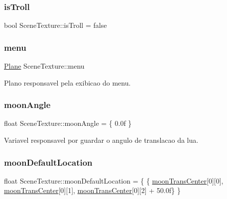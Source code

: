 \mbox{\label{class_scene_texture_a2b54560296f6bb1cd10a7f62a891641e}} 
\subsubsection{\texorpdfstring{isTroll}{isTroll}}
{\footnotesize\ttfamily bool Scene\+Texture\+::is\+Troll = false\hspace{0.3cm}{\ttfamily [static]}}

\mbox{\label{class_scene_texture_acd845ab828b015b22f1b92a111130076}} 
\subsubsection{\texorpdfstring{menu}{menu}}
{\footnotesize\ttfamily \mbox{\hyperlink{class_plane}{Plane}} Scene\+Texture\+::menu\hspace{0.3cm}{\ttfamily [private]}}



Plano responsavel pela exibicao do menu. 

\mbox{\label{class_scene_texture_a679a4ff577f9a7a82018aff021a94c13}} 
\subsubsection{\texorpdfstring{moonAngle}{moonAngle}}
{\footnotesize\ttfamily float Scene\+Texture\+::moon\+Angle = \{ 0.\+0f \}\hspace{0.3cm}{\ttfamily [static]}}



Variavel responsavel por guardar o angulo de translacao da lua. 

\mbox{\label{class_scene_texture_ae53e83f7c540d834710356dc43b991f3}} 
\subsubsection{\texorpdfstring{moonDefaultLocation}{moonDefaultLocation}}
{\footnotesize\ttfamily float Scene\+Texture\+::moon\+Default\+Location = \{ \{ \mbox{\hyperlink{class_scene_texture_a116f1f15f385d94dee75092b2feaa20c}{moon\+Trans\+Center}}\mbox{[}0\mbox{]}\mbox{[}0\mbox{]}, \mbox{\hyperlink{class_scene_texture_a116f1f15f385d94dee75092b2feaa20c}{moon\+Trans\+Center}}\mbox{[}0\mbox{]}\mbox{[}1\mbox{]}, \mbox{\hyperlink{class_scene_texture_a116f1f15f385d94dee75092b2feaa20c}{moon\+Trans\+Center}}\mbox{[}0\mbox{]}\mbox{[}2\mbox{]} + 50.\+0f\} \}\hspace{0.3cm}{\ttfamily [static]}}



